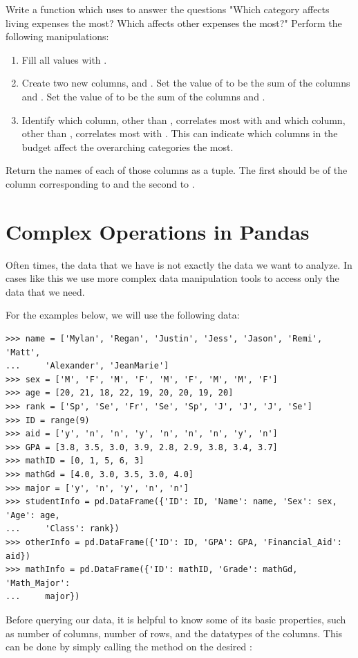 \begin{problem}
Write a function which uses  to answer the questions "Which category affects living expenses the most? Which affects other expenses the most?"
Perform the following manipulations:
\begin{enumerate}
\item Fill all  values with .
\item Create two new columns,  and .
Set the value of  to be the sum of the columns  and .
Set the value of  to be the sum of the columns  and .
\item Identify which column, other than , correlates most with  and which column, other than , correlates most with .
This can indicate which columns in the budget affect the overarching categories the most.
\end{enumerate}
Return the names of each of those columns as a tuple.
The first should be of the column corresponding to  and the second to .
\end{problem}

\section*{Complex Operations in Pandas}
Often times, the data that we have is not exactly the data we want to analyze.
In cases like this we use more complex data manipulation tools to access only the data that we need.

For the examples below, we will use the following data:
\begin{lstlisting}
>>> name = ['Mylan', 'Regan', 'Justin', 'Jess', 'Jason', 'Remi', 'Matt',
...		'Alexander', 'JeanMarie']
>>> sex = ['M', 'F', 'M', 'F', 'M', 'F', 'M', 'M', 'F']
>>> age = [20, 21, 18, 22, 19, 20, 20, 19, 20]
>>> rank = ['Sp', 'Se', 'Fr', 'Se', 'Sp', 'J', 'J', 'J', 'Se']
>>> ID = range(9)
>>> aid = ['y', 'n', 'n', 'y', 'n', 'n', 'n', 'y', 'n']
>>> GPA = [3.8, 3.5, 3.0, 3.9, 2.8, 2.9, 3.8, 3.4, 3.7]
>>> mathID = [0, 1, 5, 6, 3]
>>> mathGd = [4.0, 3.0, 3.5, 3.0, 4.0]
>>> major = ['y', 'n', 'y', 'n', 'n']
>>> studentInfo = pd.DataFrame({'ID': ID, 'Name': name, 'Sex': sex, 'Age': age,
...		'Class': rank})
>>> otherInfo = pd.DataFrame({'ID': ID, 'GPA': GPA, 'Financial_Aid': aid})
>>> mathInfo = pd.DataFrame({'ID': mathID, 'Grade': mathGd, 'Math_Major':
...		major})
\end{lstlisting}
Before querying our data, it is helpful to know some of its basic properties,
such as number of columns, number of rows, and the datatypes of the columns.
This can be done by simply calling the  method on the desired
:

